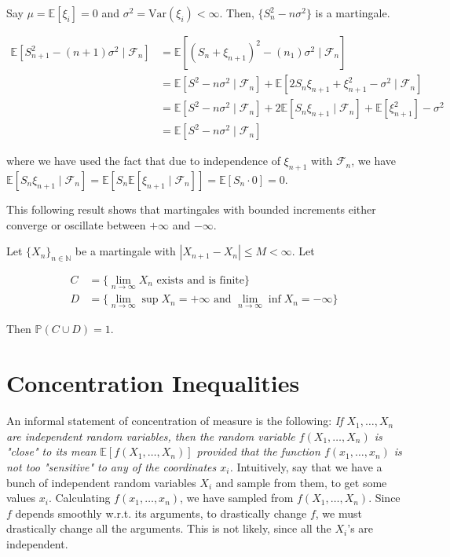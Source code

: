 \documentclass{article}
\begin{document}
  \begin{example}
  Say $\mu = \mathbb{E}[\xi_i] = 0$ and $\sigma^2 = \mathrm{Var}(\xi_i) < \infty$. Then, $\{S_n^2 - n \sigma^2\}$ is a martingale. 

  \begin{align*}
    \mathbb{E}[S_{n+1}^2 - (n + 1) \sigma^2 \mid \mathcal{F}_n] & = \mathbb{E}[ (S_n + \xi_{n+1})^2 - (n _ 1) \sigma^2 \mid \mathcal{F}_n] \\
    & = \mathbb{E}[S^2 - n \sigma^2 \mid \mathcal{F}_n ] + \mathbb{E}[ 2 S_n \xi_{n+1} + \xi_{n+1}^2 - \sigma^2 \mid \mathcal{F}_n] \\
    & = \mathbb{E}[S^2 - n \sigma^2 \mid \mathcal{F}_n ] + 2 \mathbb{E}[ S_n \xi_{n+1} \mid \mathcal{F}_n ] + \mathbb{E}[\xi_{n+1}^2] - \sigma^2  \\
    & = \mathbb{E}[S^2 - n \sigma^2 \mid \mathcal{F}_n ]
  \end{align*}

  where we have used the fact that due to independence of $\xi_{n+1}$ with $\mathcal{F}_n$, we have $\mathbb{E}[S_n \xi_{n+1} \mid \mathcal{F}_n] = \mathbb{E}[S_n \mathbb{E}[ \xi_{n+1} \mid \mathcal{F}_n]] = \mathbb{E}[S_n \cdot 0] = 0$. 
  \end{example}

  This following result shows that martingales with bounded increments either converge or oscillate between $+\infty$ and $-\infty$. 

  \begin{theorem}
    Let $\{X_n\}_{n \in \mathbb{N}}$ be a martingale with $|X_{n+1} - X_n| \leq M < \infty$. Let 

    \begin{align*}
      C & = \{\lim_{n \rightarrow \infty} X_n \text{ exists and is finite}\} \\
      D & = \{\lim_{n \rightarrow \infty} \sup X_n = +\infty \text{ and } \lim_{n \rightarrow \infty} \inf X_n = -\infty\}
    \end{align*}

    Then $\mathbb{P}(C \cup D) = 1$. 
  \end{theorem}

\section{Concentration Inequalities}

  An informal statement of concentration of measure is the following: \textit{If $X_1, \ldots, X_n$ are independent random variables, then the random variable $f(X_1, \ldots, X_n)$ is "close" to its mean $\mathbb{E}[f(X_1, \ldots, X_n)]$ provided that the function $f(x_1, \ldots, x_n)$ is not too "sensitive" to any of the coordinates $x_i$.} Intuitively, say that we have a bunch of independent random variables $X_i$ and sample from them, to get some values $x_i$. Calculating $f(x_1, \ldots, x_n)$, we have sampled from $f(X_1, \ldots, X_n)$. Since $f$ depends smoothly w.r.t. its arguments, to drastically change $f$, we must drastically change all the arguments. This is not likely, since all the $X_i$'s are independent. 
\end{document}
